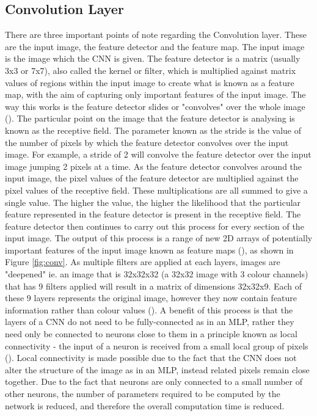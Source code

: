 \documentclass[12pt]{report}
\begin{document}
\subsection{Convolution Layer}
\begin{flushleft}
There are three important points of note regarding the Convolution layer. These are the input image, the feature detector and the feature map. The input image is the image which the CNN is given. The feature detector is a matrix (usually 3x3 or 7x7), also called the kernel or filter, which is multiplied against matrix values of regions within the input image to create what is known as a feature map, with the aim of capturing only important features of the input image. The way this works is the feature detector slides or "convolves" over the whole image (\cite{o2015introduction}). The particular point on the image that the feature detector is analysing is known as the receptive field. 
\linebreak
\linebreak
The parameter known as the stride is the value of the number of pixels by which the feature detector convolves over the input image. For example, a stride of 2 will convolve the feature detector over the input image jumping 2 pixels at a time. As the feature detector convolves around the input image, the pixel values of the feature detector are multiplied against the pixel values of the receptive field. These multiplications are all summed to give a single value. The higher the value, the higher the likelihood that the particular feature represented in the feature detector is present in the receptive field. The feature detector then continues to carry out this process for every section of the input image. The output of this process is a range of new 2D arrays of potentially important features of the input image known as feature maps (\cite{zhao2019object}), as shown in Figure \ref{fig:conv}. As multiple filters are applied at each layers, images are "deepened" ie. an image that is 32x32x32 (a 32x32 image with 3 colour channels) that has 9 filters applied will result in a matrix of dimensions 32x32x9. Each of these 9 layers represents the original image, however they now contain feature information rather than colour values (\cite{lecun1995convolutional}).
\linebreak
\linebreak
A benefit of this process is that the layers of a CNN do not need to be fully-connected as in an MLP, rather they need only be connected to neurons close to them in a principle known as local connectivity - the input of a neuron is received from a small local group of pixels (\cite{lecun1995convolutional}). Local connectivity is made possible due to the fact that the CNN does not alter the structure of the image as in an MLP, instead related pixels remain close together. Due to the fact that neurons are only connected to a small number of other neurons, the number of parameters required to be computed by the network is reduced, and therefore the overall computation time is reduced.
\end{flushleft}
\end{document}
